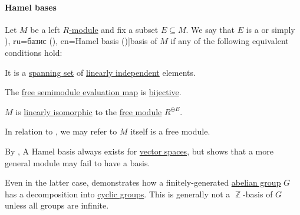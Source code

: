 \paragraph{Hamel bases}

\begin{definition}\label{def:hamel_basis}
  Let \( M \) be a left \hyperref[def:module]{\( R \)-module} and fix a subset \( E \subseteq M \). We say that \( E \) is a  or simply \term[bg=базис (\cite[100]{Обрешков1962ВисшаАлгебра}), ru=базис (\cite[\S 3.7]{Тыртышников2007ЛинейнаяАлгебра}), en=Hamel basis (\cite[example B-2.12]{Rotman2015AdvancedModernAlgebraPart1})]{basis} of \( M \) if any of the following equivalent conditions hold:

  \begin{thmenum}
     It is a \hyperref[thm:span_via_linear_combinations]{spanning set} of \hyperref[def:linear_dependence]{linearly independent} elements.

     The \hyperref[thm:free_semimodule_universal_property]{free semimodule evaluation map} is \hyperref[def:function_invertibility/bijective]{bijective}.

     \( M \) is \hyperref[def:linear_function]{linearly isomorphic} to the \hyperref[def:free_semimodule]{free module} \( R^{\oplus E} \).
  \end{thmenum}
\end{definition}
\begin{comments}
  \item In relation to , we may refer to \( M \) itself is a free module.
  \item By , A Hamel basis always exists for \hyperref[def:vector_space]{vector spaces}, but  shows that a more general module may fail to have a basis.

  Even in the latter case,  demonstrates how a finitely-generated \hyperref[def:abelian_group]{abelian group} \( G \) has a decomposition into \hyperref[def:cyclic_group]{cyclic groups}. This is generally not a \( \BbbZ \)-basis of \( G \) unless all groups are infinite.
\end{comments}
